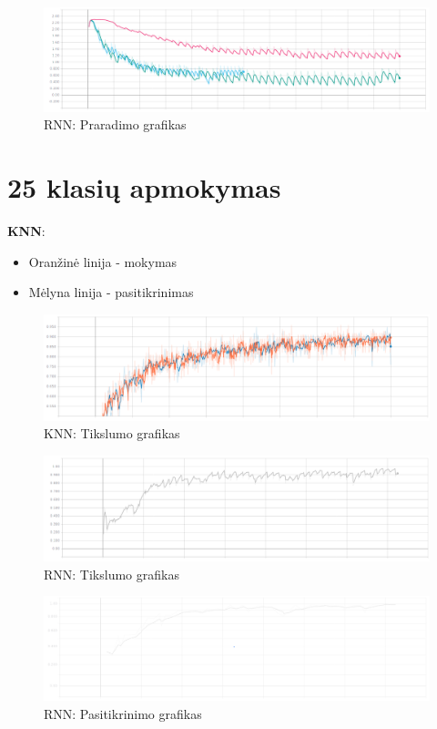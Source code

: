\documentclass{VUMIFPSbakalaurinis}
\begin{document}
\begin{figure}[H]
	\centering
	\includegraphics[scale=0.3]{img/2/loss}
	\caption{RNN: Praradimo grafikas}
	\label{img:10loss}
\end{figure}


\section{25 klasių apmokymas}
\label{appendix:25kl}



\textbf{KNN}:
\begin{itemize}
	\item Oranžinė linija - mokymas
	\item Mėlyna linija - pasitikrinimas
\end{itemize}

\begin{figure}[H]
	\centering
	\includegraphics[scale=0.3]{img/3/knn-acc}
	\caption{KNN: Tikslumo grafikas}
	\label{img:25knn-acc}
\end{figure}

\begin{figure}[H]
	\centering
	\includegraphics[scale=0.3]{img/3/acc}
	\caption{RNN: Tikslumo grafikas}
	\label{img:25acc}
\end{figure}

\begin{figure}[H]
	\centering
	\includegraphics[scale=0.3]{img/3/val}
	\caption{RNN: Pasitikrinimo grafikas}
	\label{img:25val}
\end{figure}
\end{document}
